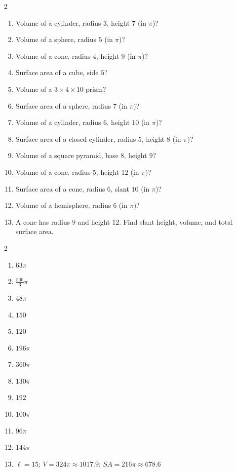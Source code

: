 \documentclass[11pt]{article}
\begin{document}
\begin{recapbox}
\begin{multicols}{2}
\small
\begin{enumerate}[leftmargin=*,itemsep=3pt]
  \item Volume of a cylinder, radius $3$, height $7$ (in $\pi$)?
  \item Volume of a sphere, radius $5$ (in $\pi$)?
  \item Volume of a cone, radius $4$, height $9$ (in $\pi$)?
  \item Surface area of a cube, side $5$?
  \item Volume of a $3\times4\times10$ prism?
  \item Surface area of a sphere, radius $7$ (in $\pi$)?
  \item Volume of a cylinder, radius $6$, height $10$ (in $\pi$)?
  \item Surface area of a closed cylinder, radius $5$, height $8$ (in $\pi$)?
  \item Volume of a square pyramid, base $8$, height $9$?
  \item Volume of a cone, radius $5$, height $12$ (in $\pi$)?
  \item Surface area of a cone, radius $6$, slant $10$ (in $\pi$)?
  \item Volume of a hemisphere, radius $6$ (in $\pi$)?
  \item A cone has radius $9$ and height $12$. Find slant height, volume, and total surface area.
\end{enumerate}
\end{multicols}
\end{recapbox}

\begin{keybox}
\begin{multicols}{2}
\small
\begin{enumerate}[leftmargin=*,itemsep=3pt]
  \item $63\pi$
  \item $\tfrac{500}{3}\pi$
  \item $48\pi$
  \item $150$
  \item $120$
  \item $196\pi$
  \item $360\pi$
  \item $130\pi$
  \item $192$
  \item $100\pi$
  \item $96\pi$
  \item $144\pi$
  \item $\ell=15$; $V=324\pi\approx1017.9$; $SA=216\pi\approx678.6$
\end{enumerate}
\end{multicols}
\end{keybox}
\end{document}
